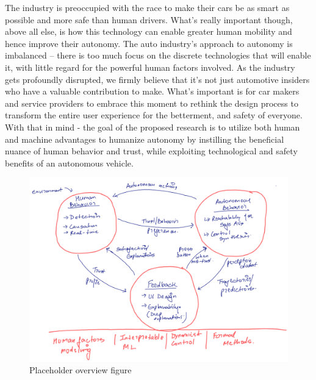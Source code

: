 The industry is preoccupied with the race to make their cars be as smart as possible and more safe than human drivers.
What’s really important though, above all else, is how this technology can enable greater human mobility and hence improve their autonomy. 
The auto industry's approach to autonomy is imbalanced – there is too much focus on the discrete technologies that will enable it, with little regard for the powerful human factors involved. 
As the industry gets profoundly disrupted, we firmly believe that it’s not just automotive insiders who have a valuable contribution to make. 
What's important is for car makers and service providers to embrace this moment to rethink the design process to transform the entire user experience for the betterment, and safety of everyone. 
With that in mind - the goal of the proposed research is to utilize both human and machine advantages to humanize autonomy by instilling the beneficial nuance of human behavior and trust, while exploiting technological and safety benefits of an autonomous vehicle.

\begin{figure}
    \centering
    \includegraphics[width=0.6\columnwidth]{figures/overview.png}
    \caption{Placeholder overview figure}
    \label{fig:overview}
\end{figure}


